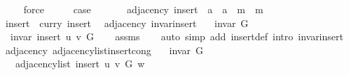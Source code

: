 \begin{isabellebody}
\ \ \ \ \isamarkupfalse%
\ force\isanewline
\ \ \isamarkupfalse%
\ \isamarkupfalse%
\ {\isacharquery}{\kern0pt}case\isanewline
\ \ \ \ \isacommand{{\isachardot}{\kern0pt}}\isamarkupfalse%
\isanewline
{}\isamarkupfalse%
%
\endisatagproof
{\isafoldproof}%
%
\isadelimproof
\isanewline
%
\endisadelimproof
\isanewline
{}\isamarkupfalse%
\ {\isacharparenleft}{\kern0pt}\ adjacency{\isacharparenright}{\kern0pt}\ insert{\isacharprime}{\kern0pt}\ {\isacharcolon}{\kern0pt}{\isacharcolon}{\kern0pt}\ {\isachardoublequoteopen}{\isacharprime}{\kern0pt}a\ {\isasymRightarrow}\ {\isacharprime}{\kern0pt}a\ {\isasymRightarrow}\ {\isacharprime}{\kern0pt}m\ {\isasymRightarrow}\ {\isacharprime}{\kern0pt}m{\isachardoublequoteclose}\ \isanewline
\ \ {\isachardoublequoteopen}insert{\isacharprime}{\kern0pt}\ {\isasymequiv}\ curry\ insert{\isachardoublequoteclose}\isanewline
\isanewline
{}\isamarkupfalse%
\ {\isacharparenleft}{\kern0pt}\ adjacency{\isacharparenright}{\kern0pt}\ invar{\isacharunderscore}{\kern0pt}insert{\isacharprime}{\kern0pt}{\isacharcolon}{\kern0pt}\isanewline
\ \ \ {\isachardoublequoteopen}invar\ G{\isachardoublequoteclose}\isanewline
\ \ \ {\isachardoublequoteopen}invar\ {\isacharparenleft}{\kern0pt}insert{\isacharprime}{\kern0pt}\ u\ v\ G{\isacharparenright}{\kern0pt}{\isachardoublequoteclose}\isanewline
%
\isadelimproof
\ \ %
\endisadelimproof
%
\isatagproof
{}\isamarkupfalse%
\ assms\isanewline
\ \ \isamarkupfalse%
\ {\isacharparenleft}{\kern0pt}auto\ simp\ add{\isacharcolon}{\kern0pt}\ insert{\isacharprime}{\kern0pt}{\isacharunderscore}{\kern0pt}def\ intro{\isacharcolon}{\kern0pt}\ invar{\isacharunderscore}{\kern0pt}insert{\isacharparenright}{\kern0pt}%
\endisatagproof
{\isafoldproof}%
%
\isadelimproof
\isanewline
%
\endisadelimproof
\isanewline
{}\isamarkupfalse%
\ {\isacharparenleft}{\kern0pt}\ adjacency{\isacharparenright}{\kern0pt}\ adjacency{\isacharunderscore}{\kern0pt}list{\isacharunderscore}{\kern0pt}insert{\isacharprime}{\kern0pt}{\isacharunderscore}{\kern0pt}cong{\isacharcolon}{\kern0pt}\isanewline
\ \ \ {\isachardoublequoteopen}invar\ G{\isachardoublequoteclose}\isanewline
\ \ \isanewline
\ \ \ \ {\isachardoublequoteopen}adjacency{\isacharunderscore}{\kern0pt}list\ {\isacharparenleft}{\kern0pt}insert{\isacharprime}{\kern0pt}\ u\ v\ G{\isacharparenright}{\kern0pt}\ w\ {\isacharequal}{\kern0pt}\isanewline

\end{isabellebody}
